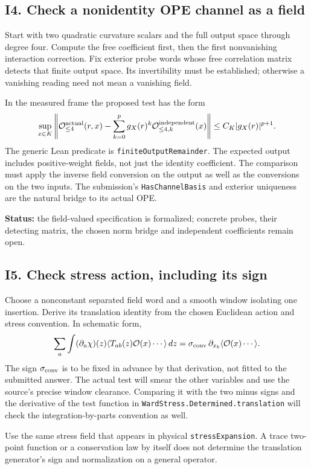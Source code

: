 \documentclass[11pt]{article}
\newcommand{\code}[1]{{\small\nolinkurl{#1}}}
\newcommand{\cO}{\mathcal O}
\begin{document}
\subsection{I4. Check a nonidentity OPE channel as a field}

Start with two quadratic curvature scalars and the full output
space through degree four. Compute the free coefficient first,
then the first nonvanishing interaction correction. Fix exterior
probe words whose free correlation matrix detects that finite
output space. Its invertibility must be established; otherwise
a vanishing reading need not mean a vanishing field.

In the measured frame the proposed test has the form
\[
 \sup_{x\in K}
 \left\|\cO^{\rm actual}_{\le4}(r,x)
       -\sum_{k=0}^p g_X(r)^k
           \cO^{\rm independent}_{\le4,k}(x)\right\|
       \le C_K |g_X(r)|^{p+1}.
\]
The generic Lean predicate is \code{finiteOutputRemainder}.
The expected output includes positive-weight fields, not just
the identity coefficient. The comparison must apply the inverse
field conversion on the output as well as the conversions on
the two inputs. The submission's \code{HasChannelBasis} and
exterior uniqueness are the natural bridge to its actual OPE.

\textbf{Status:} the field-valued specification is formalized;
concrete probes, their detecting matrix, the chosen norm bridge
and independent coefficients remain open.

\subsection{I5. Check stress action, including its sign}

Choose a nonconstant separated field word and a smooth window
isolating one insertion. Derive its translation identity from the
chosen Euclidean action and stress convention. In schematic form,
\[
 \sum_a\int (\partial_a\chi)(z)
       \langle T_{ab}(z)\cO(x)\cdots\rangle\,dz
   =\sigma_{\rm conv}\,\partial_{x_b}
       \langle\cO(x)\cdots\rangle .
\]
The sign $\sigma_{\rm conv}$ is to be fixed in advance by that
derivation, not fitted to the submitted answer. The actual test
will smear the other variables and use the source's precise
window clearance. Comparing it with the two minus signs and
the derivative of the test function in
\code{WardStress.Determined.translation} will check the
integration-by-parts convention as well.

Use the same stress field that appears in physical
\code{stressExpansion}. A trace two-point function or a
conservation law by itself does not determine the translation
generator's sign and normalization on a general operator.
\end{document}
